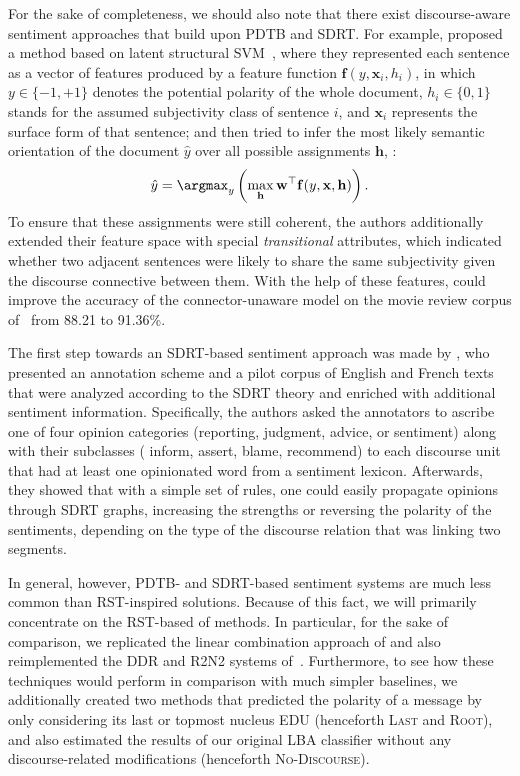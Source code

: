 For the sake of completeness, we should also note that there exist
discourse-aware sentiment approaches that build upon PDTB and SDRT\@.
For example,  proposed a method based on latent
structural SVM~\cite{Yu:09}, where they represented each sentence as a
vector of features produced by a feature function $\mathbf{f}(y,
\mathbf{x}_i, h_i)$, in which $y\in\{-1, +1\}$ denotes the potential
polarity of the whole document, $h_i \in \{0, 1\}$ stands for the
assumed subjectivity class of sentence $i$, and $\mathbf{x}_i$
represents the surface form of that sentence; and then tried to infer
the most likely semantic orientation of the document $\hat{y}$ over
all possible assignments $\mathbf{h}$, \ie{}:
\begin{equation*}
  \hat{y} =
  \argmax_y\left(\max_{\mathbf{h}}\mathbf{w}^{\top}\mathbf{f}(y,
  \mathbf{x}, \mathbf{h})\right).
\end{equation*}
To ensure that these assignments were still coherent, the authors
additionally extended their feature space with special
\emph{transitional} attributes, which indicated whether two adjacent
sentences were likely to share the same subjectivity given the
discourse connective between them.  With the help of these features,
 could improve the accuracy of the
connector-unaware model on the movie review corpus of~
from 88.21 to 91.36\%.

The first step towards an SDRT-based sentiment approach was made by
, who presented an annotation scheme and a pilot
corpus of English and French texts that were analyzed according to the
SDRT theory and enriched with additional sentiment information.
Specifically, the authors asked the annotators to ascribe one of four
opinion categories (reporting, judgment, advice, or sentiment) along
with their subclasses (\eg{} inform, assert, blame, recommend) to each
discourse unit that had at least one opinionated word from a sentiment
lexicon.  Afterwards, they showed that with a simple set of rules, one
could easily propagate opinions through SDRT graphs, increasing the
strengths or reversing the polarity of the sentiments, depending on
the type of the discourse relation that was linking two segments.

In general, however, PDTB- and SDRT-based sentiment systems are much
less common than RST-inspired solutions.  Because of this fact, we
will primarily concentrate on the RST-based of methods.  In
particular, for the sake of comparison, we replicated the linear
combination approach of  and also reimplemented the
DDR and R2N2 systems of~.  Furthermore, to see how
these techniques would perform in comparison with much simpler
baselines, we additionally created two methods that predicted the
polarity of a message by only considering its last or topmost nucleus
EDU (henceforth \textsc{Last} and \textsc{Root}), and also estimated
the results of our original LBA classifier without any
discourse-related modifications (henceforth \textsc{No-Discourse}).
